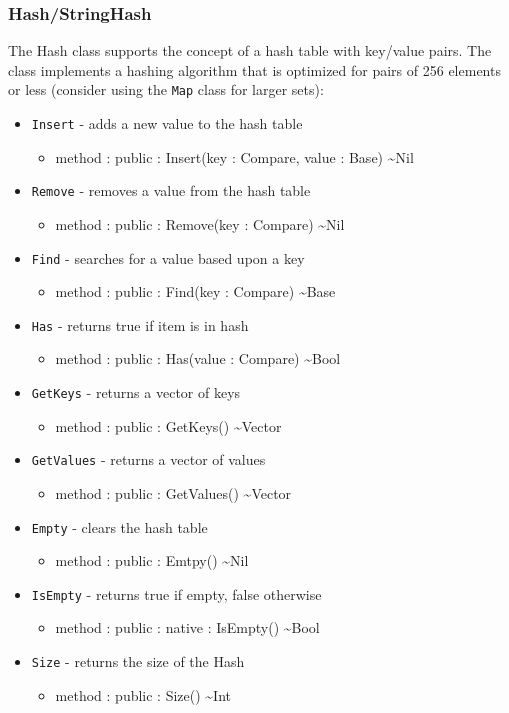\documentclass[11pt]{article}
\begin{document}
\subsubsection{Hash/StringHash}
The Hash class supports the concept of a hash table with key/value
pairs.  The class implements a hashing algorithm that is optimized for
pairs of 256 elements or less (consider using the \texttt{Map} class
for larger sets):
\begin{itemize}
\item \texttt{Insert} - adds a new value to the hash table
  \begin{itemize}
  \item method : public : Insert(key : Compare, value : Base)
    \textasciitilde Nil
  \end{itemize}
\item \texttt{Remove} - removes a value from the hash table
  \begin{itemize}
  \item method : public : Remove(key : Compare) \textasciitilde Nil
  \end{itemize}
\item \texttt{Find} - searches for a value based upon a key
  \begin{itemize}
  \item method : public : Find(key : Compare) \textasciitilde Base
  \end{itemize}
\item \texttt{Has} - returns true if item is in hash
  \begin{itemize}
  \item method : public : Has(value : Compare) \textasciitilde Bool
  \end{itemize}
\item \texttt{GetKeys} - returns a vector of keys
  \begin{itemize}
  \item method : public : GetKeys() \textasciitilde Vector
  \end{itemize}
\item \texttt{GetValues} - returns a vector of values
  \begin{itemize}
  \item method : public : GetValues() \textasciitilde Vector
  \end{itemize}
\item \texttt{Empty} - clears the hash table
  \begin{itemize}
  \item method : public : Emtpy() \textasciitilde Nil
  \end{itemize}
\item \texttt{IsEmpty} - returns true if empty, false otherwise
  \begin{itemize}
  \item method : public : native : IsEmpty() \textasciitilde Bool
  \end{itemize}
\item \texttt{Size} - returns the size of the Hash
  \begin{itemize}
  \item method : public : Size() \textasciitilde Int
  \end{itemize}
\end{itemize}
\end{document}
